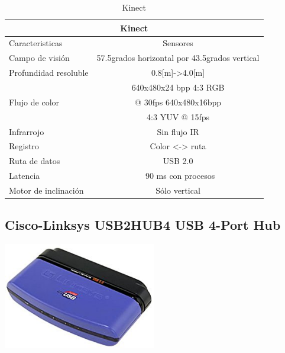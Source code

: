 \documentclass[a4paper]{book}
\begin{document}
\begin{table}[H]
\begin{center}
\begin{tabular}{|l|l|}%


\hline
\multicolumn{2}{|c|}{Kinect} \\ \hline %
Caracteristicas & \multicolumn{1}{|c|}{Sensores}\\ \hline
Campo de visión & \multicolumn{1}{|c|}{57.5grados horizontal por 43.5grados vertical}\\ \hline
Profundidad resoluble& \multicolumn{1}{|c|}{0.8[m]->4.0[m]}\\ \hline
\multirow{3}{1cm}{Flujo de color} & \multicolumn{1}{|c|}{640x480x24 bpp 4:3 RGB} \\  & \multicolumn{1}{|c|}{@ 30fps 640x480x16bpp} \\  & \multicolumn{1}{|c|}{4:3 YUV @ 15fps} \\  \hline
Infrarrojo & \multicolumn{1}{|c|}{Sin flujo IR}\\ \hline
Registro & \multicolumn{1}{|c|}{Color <-> ruta}\\ \hline
Ruta de datos & \multicolumn{1}{|c|}{USB 2.0}\\ \hline
Latencia & \multicolumn{1}{|c|}{~90 ms con procesos}\\ \hline
Motor de inclinación & \multicolumn{1}{|c|}{Sólo vertical}\\ \hline

\end{tabular}
\caption{Kinect}
\label{Datos del Kinect}
\end{center}
\end{table}

\vfill

\subsection{Cisco-Linksys USB2HUB4 USB 4-Port Hub}

\begin{center}
\includegraphics[width=0.5\textwidth]{Figures/Hardware/Partes/Cisco-Linksys.png}
\label{fig:Hardware:Partes:Cisco}
\end{center}
\end{document}
